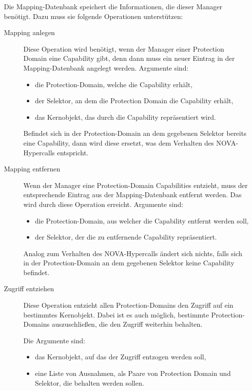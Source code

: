 \documentclass[a4paper, parskip]{scrartcl}
\begin{document}
Die Mapping-Datenbank speichert die Informationen, die dieser Manager benötigt. Dazu muss sie folgende Operationen unterstützen:

\begin{description}
  \item[Mapping anlegen]
    Diese Operation wird benötigt, wenn der Manager einer Protection Domain eine Capability gibt, denn dann muss ein neuer Eintrag in der Mapping-Datenbank angelegt werden.
    Argumente sind:

    \begin{itemize}[nosep]
    \item die Protection-Domain, welche die Capability erhält,
    \item der Selektor, an dem die Protection Domain die Capability erhält,
    \item das Kernobjekt, das durch die Capability repräsentiert wird.
    \end{itemize}

    Befindet sich in der Protection-Domain an dem gegebenen Selektor bereits eine Capability, dann wird diese ersetzt, was dem Verhalten des NOVA-Hypercalls entspricht.
  \item[Mapping entfernen]
    Wenn der Manager eine Protection-Domain Capabilities entzieht, muss der entsprechende Eintrag aus der Mapping-Datenbank entfernt werden. 
    Das wird durch diese Operation erreicht. Argumente sind:

    \begin{itemize}[nosep]
    \item die Protection-Domain, aus welcher die Capability entfernt werden soll,
    \item der Selektor, der die zu entfernende Capability repräsentiert.
    \end{itemize}

    Analog zum Verhalten des NOVA-Hypercalls ändert sich nichts, falls sich in der Protection-Domain an dem gegebenen Selektor keine Capability befindet.
  \item[Zugriff entziehen]
    Diese Operation entzieht allen Protection-Domains den Zugriff auf ein bestimmtes Kernobjekt. 
    Dabei ist es auch möglich, bestimmte Protection-Domains auszuschließen, die den Zugriff weiterhin behalten.

    Die Argumente sind:
    \begin{itemize}[nosep]
    \item das Kernobjekt, auf das der Zugriff entzogen werden soll,
    \item eine Liste von Ausnahmen, als Paare von Protection Domain und Selektor, die behalten werden sollen.
    \end{itemize}
\end{description}
\end{document}
